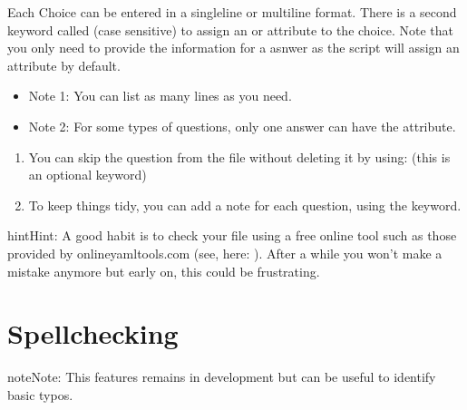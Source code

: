 \documentclass[letterpaper,10pt,english]{sphinxmanual}
\begin{document}
Each Choice can be entered in a single\sphinxhyphen{}line or multiline format. There is a second keyword called  (case sensitive) to assign an  or  attribute to the choice. Note that you only need to provide the information for a  asnwer as the script will assign an  attribute by default.
\begin{itemize}
\item {} 
Note 1: You can list as many  lines as you need.

\item {} 
Note 2: For some types of questions, only one answer can have the  attribute.

\end{itemize}
\begin{enumerate}
%
\setcounter{enumi}{3}
\item {} 
You can skip the question from the file without deleting it by using:  (this is an optional keyword)

\item {} 
To keep things tidy, you can add a note for each question, using the  keyword.

\end{enumerate}

\begin{sphinxadmonition}{hint}{Hint:}
A good habit is to check your  file using a free online
tool such as those provided by onlineyamltools.com (see, here: ). After a while you won’t make a mistake anymore but early on, this could be frustrating.
\end{sphinxadmonition}


\chapter{Spellchecking}
\label{\detokenize{spellcheck:spellchecking}}\label{\detokenize{spellcheck:spellcheck-label}}\label{\detokenize{spellcheck::doc}}
\begin{sphinxadmonition}{note}{Note:}
This features remains in development but can be useful to identify basic typos.
\end{sphinxadmonition}
\end{document}
